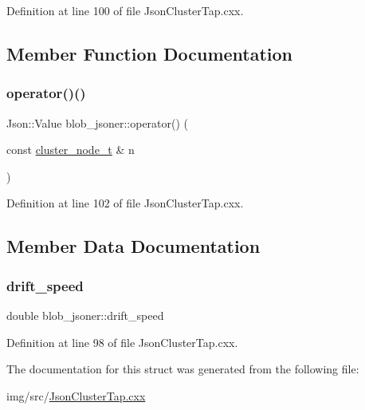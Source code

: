 Definition at line 100 of file Json\+Cluster\+Tap.\+cxx.



\subsection{Member Function Documentation}
\mbox{\label{structblob__jsoner_a29d902d01e4b6ee0fe321919b32fcc5d}} 
\subsubsection{\texorpdfstring{operator()()}{operator()()}}
{\footnotesize\ttfamily Json\+::\+Value blob\+\_\+jsoner\+::operator() (\begin{DoxyParamCaption}\item[{const \hyperlink{struct_wire_cell_1_1cluster__node__t}{cluster\+\_\+node\+\_\+t} \&}]{n }\end{DoxyParamCaption})\hspace{0.3cm}{\ttfamily [inline]}}



Definition at line 102 of file Json\+Cluster\+Tap.\+cxx.



\subsection{Member Data Documentation}
\mbox{\label{structblob__jsoner_a1847ed6d883a3b917ce7b3288104e15a}} 
\subsubsection{\texorpdfstring{drift\+\_\+speed}{drift\_speed}}
{\footnotesize\ttfamily double blob\+\_\+jsoner\+::drift\+\_\+speed}



Definition at line 98 of file Json\+Cluster\+Tap.\+cxx.



The documentation for this struct was generated from the following file\+:\begin{DoxyCompactItemize}
\item 
img/src/\hyperlink{_json_cluster_tap_8cxx}{Json\+Cluster\+Tap.\+cxx}\end{DoxyCompactItemize}
